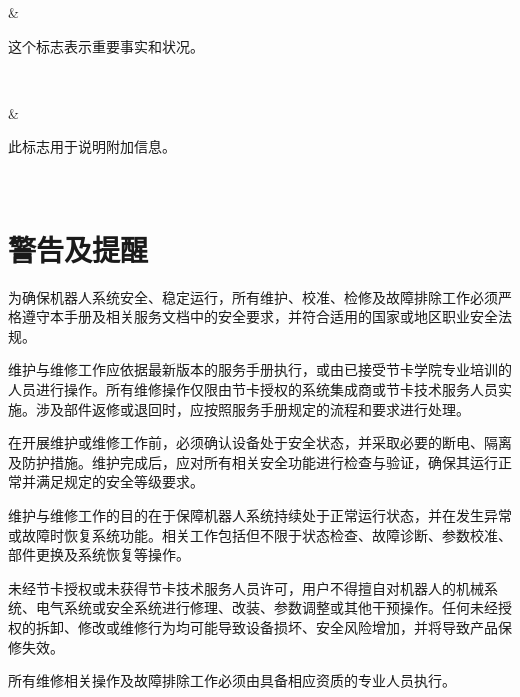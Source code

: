 \documentclass[a4paper,11pt,english,openany,oneside]{sphinxmanual}
\begin{document}
\begin{savenotes}
\begin{tabular}[t]{}
\begin{varwidth}[t]{}
\sphinxbeforeendvarwidth
\end{varwidth}%
&\begin{varwidth}[t]{}
\sphinxAtStartPar
这个标志表示重要事实和状况。
\sphinxbeforeendvarwidth
\end{varwidth}%
\\
\sphinxhline\begin{varwidth}[t]{}
\sphinxAtStartPar
{}
\sphinxbeforeendvarwidth
\end{varwidth}%
&\begin{varwidth}[t]{}
\sphinxAtStartPar
此标志用于说明附加信息。
\sphinxbeforeendvarwidth
\end{varwidth}%
\\
\sphinxbottomrule
\end{tabular}
\sphinxtableafterendhook\par
\sphinxattableend\end{savenotes}


\section{警告及提醒}
\label{\detokenize{_u5b89_u5168_u89c4_u8303:id4}}
\sphinxAtStartPar
为确保机器人系统安全、稳定运行，所有维护、校准、检修及故障排除工作必须严格遵守本手册及相关服务文档中的安全要求，并符合适用的国家或地区职业安全法规。

\sphinxAtStartPar
维护与维修工作应依据最新版本的服务手册执行，或由已接受节卡学院专业培训的人员进行操作。所有维修操作仅限由节卡授权的系统集成商或节卡技术服务人员实施。涉及部件返修或退回时，应按照服务手册规定的流程和要求进行处理。

\sphinxAtStartPar
在开展维护或维修工作前，必须确认设备处于安全状态，并采取必要的断电、隔离及防护措施。维护完成后，应对所有相关安全功能进行检查与验证，确保其运行正常并满足规定的安全等级要求。

\sphinxAtStartPar
维护与维修工作的目的在于保障机器人系统持续处于正常运行状态，并在发生异常或故障时恢复系统功能。相关工作包括但不限于状态检查、故障诊断、参数校准、部件更换及系统恢复等操作。

\sphinxAtStartPar
未经节卡授权或未获得节卡技术服务人员许可，用户不得擅自对机器人的机械系统、电气系统或安全系统进行修理、改装、参数调整或其他干预操作。任何未经授权的拆卸、修改或维修行为均可能导致设备损坏、安全风险增加，并将导致产品保修失效。

\sphinxAtStartPar
所有维修相关操作及故障排除工作必须由具备相应资质的专业人员执行。
\end{document}
